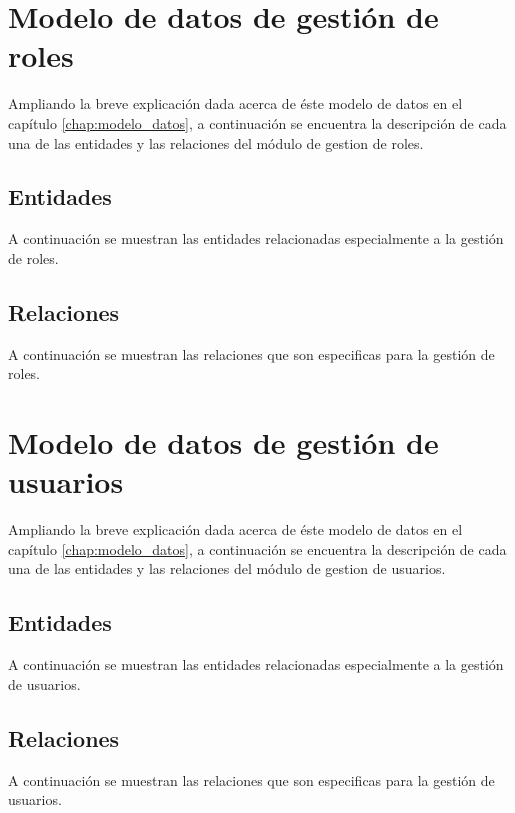 \section{Modelo de datos de gestión de roles}
Ampliando la breve explicación dada acerca de éste modelo de datos en el capítulo \ref{chap:modelo_datos}, a continuación se encuentra la descripción de cada una de las entidades y las relaciones del módulo de gestion de roles.
\subsection{Entidades}
A continuación se muestran las entidades relacionadas especialmente a la gestión de roles.


\subsection{Relaciones}
A continuación se muestran las relaciones que son especificas para la gestión de roles.



\section{Modelo de datos de gestión de usuarios}
Ampliando la breve explicación dada acerca de éste modelo de datos en el capítulo \ref{chap:modelo_datos}, a continuación se encuentra la descripción de cada una de las entidades y las relaciones del módulo de gestion de usuarios.
\subsection{Entidades}
A continuación se muestran las entidades relacionadas especialmente a la gestión de usuarios.




\subsection{Relaciones}
A continuación se muestran las relaciones que son especificas para la gestión de usuarios.




